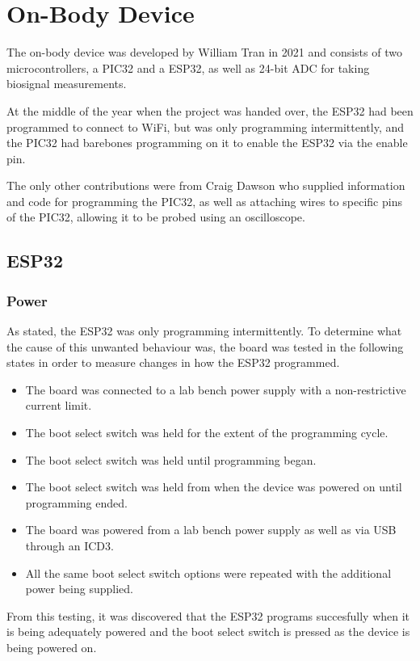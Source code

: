 \chapter{On-Body Device}
The on-body device was developed by William Tran in 2021 and consists of two microcontrollers,
a PIC32 and a ESP32, as well as 24-bit ADC for taking biosignal measurements.

At the middle of the year when the project was handed over,
the ESP32 had been programmed to connect to WiFi, but was only programming intermittently,
and the PIC32 had barebones programming on it to enable the ESP32 via the enable pin.

The only other contributions were from Craig Dawson who supplied information and code for programming the PIC32,
as well as attaching wires to specific pins of the PIC32, allowing it to be probed using an oscilloscope.


\section{ESP32}
\subsection{Power}
As stated, the ESP32 was only programming intermittently.
To determine what the cause of this unwanted behaviour was,
the board was tested in the following states in order to measure changes in how the ESP32 programmed.

\begin{itemize}
        \item The board was connected to a lab bench power supply with a non-restrictive current limit.
        \item The boot select switch was held for the extent of the programming cycle.
        \item The boot select switch was held until programming began.
        \item The boot select switch was held from when the device was powered on until programming ended.
        \item The board was powered from a lab bench power supply as well as via USB through an ICD3.
        \item All the same boot select switch options were repeated with the additional power being supplied.
\end{itemize}

From this testing, it was discovered that the ESP32 programs succesfully when it is being adequately powered
and the boot select switch is pressed as the device is being powered on.

